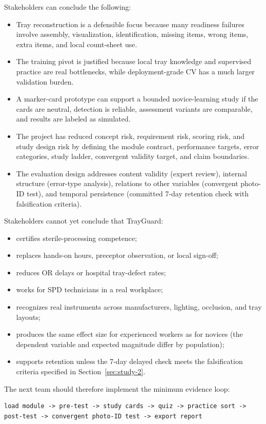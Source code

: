 \documentclass[10pt,a4paper]{article}
\begin{document}
Stakeholders can conclude the following:
\begin{itemize}
  \item Tray reconstruction is a defensible focus because many readiness failures involve assembly, visualization, identification, missing items, wrong items, extra items, and local count-sheet use.
  \item The training pivot is justified because local tray knowledge and supervised practice are real bottlenecks, while deployment-grade CV has a much larger validation burden.
  \item A marker-card prototype can support a bounded novice-learning study if the cards are neutral, detection is reliable, assessment variants are comparable, and results are labeled as simulated.
  \item The project has reduced concept risk, requirement risk, scoring risk, and study design risk by defining the module contract, performance targets, error categories, study ladder, convergent validity target, and claim boundaries.
  \item The evaluation design addresses content validity (expert review), internal structure (error-type analysis), relations to other variables (convergent photo-ID test), and temporal persistence (committed 7-day retention check with falsification criteria).
\end{itemize}
Stakeholders cannot yet conclude that TrayGuard:
\begin{itemize}
  \item certifies sterile-processing competence;
  \item replaces hands-on hours, preceptor observation, or local sign-off;
  \item reduces OR delays or hospital tray-defect rates;
  \item works for SPD technicians in a real workplace;
  \item recognizes real instruments across manufacturers, lighting, occlusion, and tray layouts;
  \item produces the same effect size for experienced workers as for novices (the dependent variable and expected magnitude differ by population);
  \item supports retention unless the 7-day delayed check meets the falsification criteria specified in Section~\ref{sec:study-2}.
\end{itemize}
The next team should therefore implement the minimum evidence loop:
\begin{lstlisting}
load module -> pre-test -> study cards -> quiz -> practice sort -> post-test -> convergent photo-ID test -> export report
\end{lstlisting}
\end{document}
